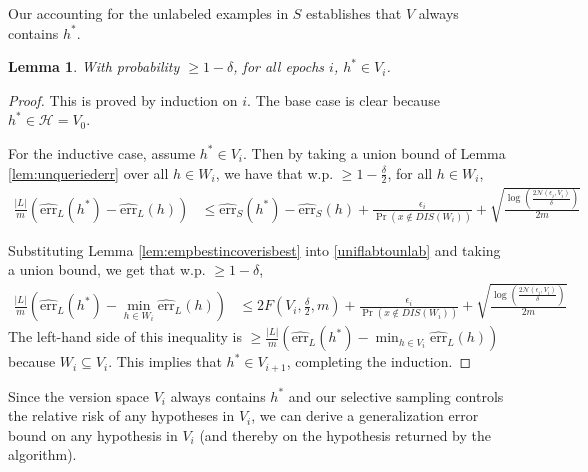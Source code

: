 \documentclass{article}[12pt]
\newtheorem{lem}[thm]{Lemma}
\theoremstyle{named}
\DeclareMathOperator{\Prtxt}{Pr}
\newcommand{\abs}[1]{\left| #1 \right|}
\newcommand{\prp}[2]{\Prtxt_{#2} \left(#1\right)}
\newcommand{\emperr}[2]{\widehat{\mbox{err}}_{#2} \left(#1\right)}
\newcommand{\cH}{\mathcal{H}}
\newcommand{\cN}{\mathcal{N}}
\newcommand{\lrp}[1]{\left(#1\right)}
\begin{document}
Our accounting for the unlabeled examples in $S$ establishes that $V$ always contains $h^*$.

\begin{lem}
\label{lem:optisinvs}
With probability $\geq 1 - \delta$, for all epochs $i$, $h^* \in V_i$.
\end{lem}
\begin{proof}
This is proved by induction on $i$. 
The base case is clear because $h^* \in \cH = V_0$. 

For the inductive case, assume $h^* \in V_i$. 
Then by taking a union bound of Lemma \ref{lem:unqueriederr} over all $h \in W_i$, 
we have that w.p. $\geq 1-\frac{\delta}{2}$, for all $h \in W_i$,
\begin{align}
\label{uniflabtounlab}
\frac{\abs{L}}{m} \lrp{\emperr{h^*}{L}  - \emperr{h}{L} } 
&\leq \emperr{h^*}{S} - \emperr{h}{S} + \frac{\epsilon_i}{\prp{x \notin DIS(W_i)}{}} + \sqrt{\frac{\log \lrp{\frac{ 2 \cN (\epsilon_i, V_i) }{\delta}} }{2m }} 
\end{align}

Substituting Lemma \ref{lem:empbestincoverisbest} into \eqref{uniflabtounlab} and taking a union bound, 
we get that w.p. $\geq 1 - \delta$, 
\begin{align*}
\frac{\abs{L}}{m} \lrp{\emperr{h^*}{L}  - \min_{h \in W_i} \emperr{h}{L} } 
&\leq 2 F \lrp{ V_i, \frac{\delta}{2}, m } + \frac{\epsilon_i}{\prp{x \notin DIS(W_i)}{}} 
+ \sqrt{\frac{\log \lrp{\frac{ 2 \cN (\epsilon_i, V_i) }{\delta}} }{2m }}
\end{align*}
The left-hand side of this inequality is $\geq \frac{\abs{L}}{m} \lrp{\emperr{h^*}{L}  - \min_{h \in V_i} \emperr{h}{L} }$ 
because $W_i \subseteq V_i$.
This implies that $h^* \in V_{i+1}$, completing the induction.
\end{proof}

Since the version space $V_i$ always contains $h^*$ and 
our selective sampling controls the relative risk of any hypotheses in $V_i$, 
we can derive a generalization error bound on any hypothesis in $V_i$ 
(and thereby on the hypothesis returned by the algorithm).
\end{document}
